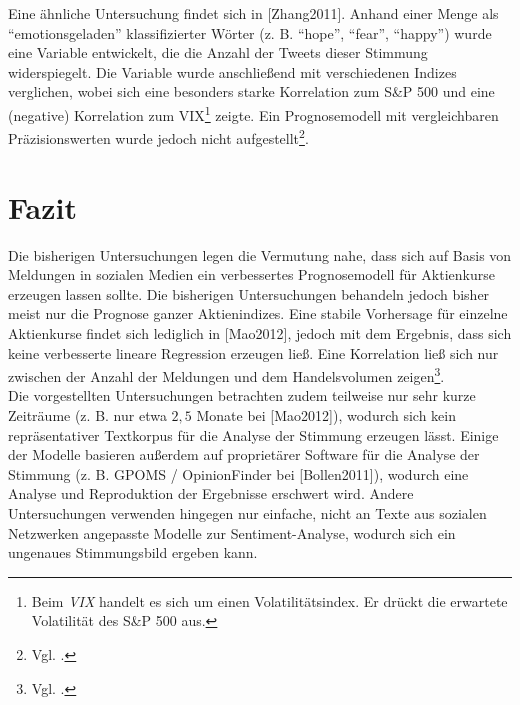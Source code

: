 \documentclass[
	a4paper,
	12pt,
	bibliography=totocnumbered,
	twoside,
]{scrreprt}
\begin{document}
Eine ähnliche Untersuchung findet sich in [Zhang2011]. Anhand einer Menge als "`emotionsgeladen"' klassifizierter Wörter (z. B. "`hope"', "`fear"', "`happy"') wurde eine Variable entwickelt, die die Anzahl der Tweets dieser Stimmung widerspiegelt. Die Variable wurde anschließend mit verschiedenen Indizes verglichen, wobei sich eine besonders starke Korrelation zum S\&P 500 und eine (negative) Korrelation zum VIX\footnote{Beim \textit{VIX} handelt es sich um einen Volatilitätsindex. Er drückt die erwartete Volatilität des S\&P 500 aus.} zeigte. Ein Prognosemodell mit vergleichbaren Präzisionswerten wurde jedoch nicht aufgestellt\footnote{Vgl. \citet{zhang2011}.}.




\section{Fazit}
Die bisherigen Untersuchungen legen die Vermutung nahe, dass sich auf Basis von Meldungen in sozialen Medien ein verbessertes Prognosemodell für Aktienkurse erzeugen lassen sollte.  Die bisherigen Untersuchungen behandeln jedoch bisher meist nur die Prognose ganzer Aktienindizes. Eine stabile Vorhersage für einzelne Aktienkurse findet sich lediglich in [Mao2012], jedoch mit dem Ergebnis, dass sich keine verbesserte lineare Regression erzeugen ließ. Eine Korrelation ließ sich nur zwischen der Anzahl der Meldungen und dem Handelsvolumen zeigen\footnote{Vgl. \citet{mao2012}.}.\\

Die vorgestellten Untersuchungen betrachten zudem teilweise nur sehr kurze Zeiträume (z. B. nur etwa $2,5$ Monate bei [Mao2012]), wodurch sich kein repräsentativer Textkorpus für die Analyse der Stimmung erzeugen lässt. Einige der Modelle basieren außerdem auf proprietärer Software für die Analyse der Stimmung (z. B. GPOMS / OpinionFinder bei [Bollen2011]), wodurch eine Analyse und Reproduktion der Ergebnisse erschwert wird. Andere Untersuchungen verwenden hingegen nur einfache, nicht an Texte aus sozialen Netzwerken angepasste Modelle zur Sentiment-Analyse, wodurch sich ein ungenaues Stimmungsbild ergeben kann.\\





\end{document}
